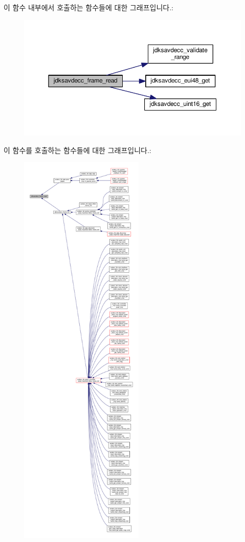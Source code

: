 이 함수 내부에서 호출하는 함수들에 대한 그래프입니다.\+:
\nopagebreak
\begin{figure}[H]
\begin{center}
\leavevmode
\includegraphics[width=350pt]{group__frame_gab6f5d97a229e032dbdd3a3cb18cfffb4_cgraph}
\end{center}
\end{figure}




이 함수를 호출하는 함수들에 대한 그래프입니다.\+:
\nopagebreak
\begin{figure}[H]
\begin{center}
\leavevmode
\includegraphics[height=550pt]{group__frame_gab6f5d97a229e032dbdd3a3cb18cfffb4_icgraph}
\end{center}
\end{figure}


